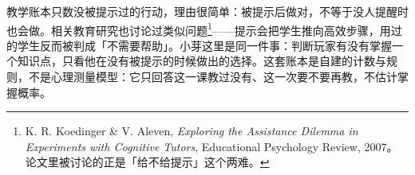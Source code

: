 教学账本只数没被提示过的行动，理由很简单：被提示后做对，不等于没人提醒时也会做。相关教育研究也讨论过类似问题\footnote{K. R. Koedinger \& V. Aleven, \emph{Exploring the Assistance Dilemma in Experiments with Cognitive Tutors}, Educational Psychology Review, 2007。论文里被讨论的正是「给不给提示」这个两难。}——提示会把学生推向高效步骤，用过的学生反而被判成「不需要帮助」。小芽这里是同一件事：判断玩家有没有掌握一个知识点，只看他在没有被提示的时候做出的选择。这套账本是自建的计数与规则，不是心理测量模型：它只回答这一课教过没有、这一次要不要再教，不估计掌握概率。
